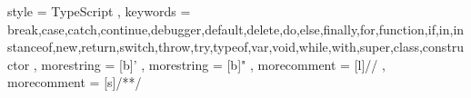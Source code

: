 
{
    style             = TypeScript
,   keywords          = {break,case,catch,continue,debugger,default,delete,do,else,finally,for,function,if,in,instanceof,new,return,switch,throw,try,typeof,var,void,while,with,super,class,constructor}
,   morestring        = [b]'
,   morestring        = [b]"
,   morecomment       = [l]{//}
,   morecomment       = [s]{/*}{*/}
}

{
}
